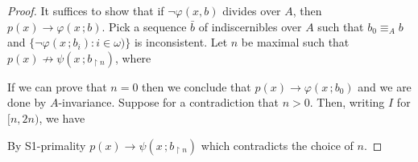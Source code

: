 \documentclass[10pt,oneside]{amsproc}
\renewcommand*{\emph}[1]{%
   \smash{\tikz[baseline]\node[rectangle, fill=teal!25, rounded corners, inner xsep=0.5ex, inner ysep=0.2ex, anchor=base, minimum height = 2.7ex]{\strut #1};}}
\begin{document}
\begin{proof}
  It suffices to show that if $\neg\varphi(x, b)$ divides over $A$, then  $p(x)\rightarrow\varphi(x\,;b)$.
  Pick a sequence $\bar b$ of indiscernibles over $A$ such that $b_0\equiv_Ab$ and $\{\neg\varphi(x\,;b_i):i\in\omega)\}$ is inconsistent.
  Let $n$ be maximal such that $p(x)\nrightarrow\psi(x\,;b_{\restriction n})$, where
  
  
   If we can prove that $n=0$ then we conclude that $p(x)\rightarrow\varphi(x\,;b_0)$ and we are done by $A$-invariance.
   Suppose for a contradiction that $n>0$.
   Then, writing $I$ for $[n,2n)$, we have

 
  By S1-primality $p(x)\rightarrow\psi(x\,;b_{\restriction n})$ which contradicts the choice of $n$.
\end{proof}






  
  
\end{document}
